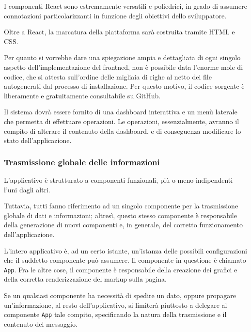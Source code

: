 I componenti React sono estremamente versatili e poliedrici, in grado di assumere connotazioni particolarizzanti in funzione degli obiettivi dello sviluppatore. 

Oltre a React, la marcatura della piattaforma sarà costruita tramite HTML e CSS. 

Per quanto si vorrebbe dare una spiegazione ampia e dettagliata di ogni singolo aspetto dell'implementazione del frontned, non è possibile data l'enorme mole di codice, che si attesta sull'ordine delle migliaia di righe al netto dei file autogenerati dal processo di installazione. Per questo motivo, il codice sorgente è liberamente e gratuitamente consultabile su GitHub. \cite{lwIndexGithub}

\vspace{3mm}

Il sistema dovrà essere fornito di una dashboard interattiva e un menù laterale che permetta di effettuare operazioni. Le operazioni, essenzialmente, avranno il compito di alterare il contenuto della dashboard, e di conseguenza modificare lo stato dell'applicazione.

\newpage

\subsubsection{Trasmissione globale delle informazioni}

L'applicativo è strutturato a componenti funzionali, più o meno indipendenti l'uni dagli altri. 

Tuttavia, tutti fanno riferimento ad un singolo componente per la trasmissione globale di dati e informazioni; altresì, questo stesso componente è responsabile della generazione di nuovi componenti e, in generale, del corretto funzionamento dell'applicazione. 

L'intero applicativo è, ad un certo istante, un'istanza delle possibili configurazioni che il suddetto componente può assumere. Il componente in questione è chiamato \verb|App|. Fra le altre cose, il componente è responsabile della creazione dei grafici e della corretta renderizzazione del markup sulla pagina.

Se un qualsiasi componente ha necessità di spedire un dato, oppure propagare un'informazione, al resto dell'applicativo, si limiterà piuttosto a delegare al componente \verb|App| tale compito, specificando la natura della trasmissione e il contenuto del messaggio.

\vspace{3mm}

